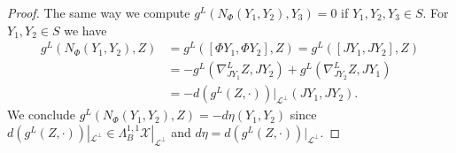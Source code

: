 \documentclass[a4paper,10pt,twoside]{amsart}
\theoremstyle{definition}
\theoremstyle{remark}
\numberwithin{equation}{section}
\begin{document}
\begin{proof}
	The same way we compute $g^{L}(N_{\Phi}(Y_{1},Y_{2}),Y_{3})=0$ if $Y_{1},Y_{2},Y_{3} \in S$. For $Y_{1},Y_{2} \in S$ we have
	\begin{align*}
		g^{L}(N_{\Phi}(Y_{1},Y_{2}),Z) &= g^{L}([\Phi Y_{1},\Phi Y_{2}],Z) = g^{L}([JY_{1},JY_{2}],Z)\\
					&= -g^{L}(\nabla^{L}_{JY_{1}}{Z},JY_{2}) + g^{L}(\nabla^{L}_{JY_{2}}{Z},JY_{1})\\
					&=-d(g^{L}(Z,\cdot))|_{\mathcal{L}^{\perp}}(JY_{1},JY_{2}).
	\end{align*}
	We conclude $g^{L}(N_{\Phi}(Y_{1},Y_{2}),Z) = -d\eta(Y_{1},Y_{2})$ since
	$d(g^{L}(Z,\cdot))|_{\mathcal{L}^{\perp}} \in \Lambda^{1,1}_{B}\mathcal{X}|_{\mathcal{L}^{\perp}}$ and
	$d\eta = d(g^{L}(Z,\cdot))|_{\mathcal{L}^{\perp}}$.
\end{proof}

\nocite{*}

\end{document}
